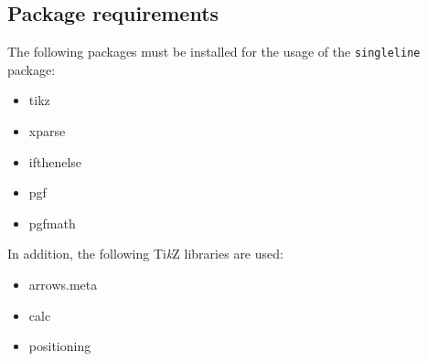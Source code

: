 \documentclass[a4]{article}
\newcommand*\Tikz{\textup{Ti\textit kZ}\xspace}
\begin{document}
\subsection{Package requirements}
The following packages must be installed for the usage of the \texttt{singleline} package:
\begin{itemize}
        \item tikz
        \item xparse
        \item ifthenelse
        \item pgf
        \item pgfmath
\end{itemize}
In addition, the following \Tikz libraries are used:
\begin{itemize}
        \item arrows.meta
        \item calc
        \item positioning
\end{itemize}
\end{document}
